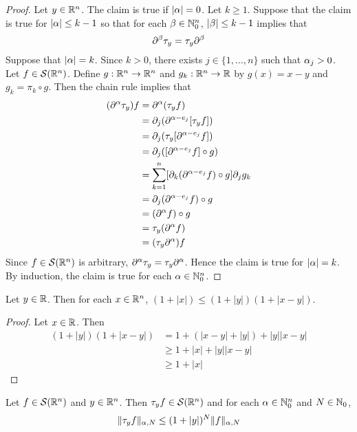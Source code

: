 \documentclass{book}
\begin{document}
	\begin{proof}
		Let $y \in \mathbb{R}^n$. The claim is true if $|\alpha| = 0$. Let $k \geq 1$. Suppose that the claim is true for $|\alpha| \leq k-1$ so that for each $\beta \in \mathbb{N}_0^n$, $|\beta| \leq k-1$ implies that
		$$\partial^{\beta}\tau_y = \tau_y \partial^{\beta}$$ 
		Suppose that $|\alpha| = k$. Since $k >0$, there exists $j \in \{1, \ldots, n\}$ such that $\alpha_j >0$. Let $f \in \mathcal{S}(\mathbb{R}^n)$. Define $g: \mathbb{R}^n \rightarrow \mathbb{R}^n$ and $g_k : \mathbb{R}^n \rightarrow \mathbb{R}$ by $g(x) = x-y$ and $g_k = \pi_k \circ g$. Then the chain rule implies that
		\begin{align*}
			(\partial^{\alpha} \tau_y) f
			& = \partial^{\alpha}( \tau_y f) \\
			& = \partial_j (\partial^{\alpha-e_j} [\tau_y f]) \\
			& = \partial_j (\tau_y [\partial^{\alpha-e_j} f]) \\
			& = \partial_j ([\partial^{\alpha-e_j} f] \circ g) \\
			& = \sum_{k=1}^n [\partial_k(\partial^{\alpha - e_j} f) \circ g]  \partial_j g_k \\ 
			& = \partial_j(\partial^{\alpha - e_j} f) \circ g \\
			& = (\partial^{\alpha} f) \circ g \\ 
			& = \tau_y ( \partial^{\alpha} f) \\
			& = (\tau_y  \partial^{\alpha}) f
		\end{align*}
		Since $f \in \mathcal{S}(\mathbb{R}^n)$ is arbitrary, $\partial^{\alpha} \tau_y = \tau_y  \partial^{\alpha}$. Hence the claim is true for $|\alpha| = k$. By induction, the claim is true for each $\alpha \in \mathbb{N}_0^n$.
	\end{proof}

	\begin{ex} 
		Let $y \in \mathbb{R}$. Then for each $x \in \mathbb{R}^n$,  $(1+|x|) \leq (1 + |y|)(1+ |x-y|)$.
	\end{ex}

	\begin{proof}
		Let $x \in \mathbb{R}$. Then 
		\begin{align*}
			(1 + |y|)(1+ |x-y|) 
			& = 1 + (|x-y| + |y|) + |y||x-y| \\
			& \geq 1 + |x| + |y||x-y| \\
			& \geq 1 + |x| 
		\end{align*}
	\end{proof}

	\begin{ex}
		Let $f \in \mathcal{S}(\mathbb{R}^n)$ and $y \in \mathbb{R}^n$. Then $\tau_y f \in \mathcal{S}(\mathbb{R}^n)$ and for each $\alpha \in \mathbb{N}_0^n$ and $N \in \mathbb{N}_0$, 
		$$\|\tau_yf\|_{\alpha, N} \leq (1 + |y|)^N \|f\|_{\alpha, N}$$
	\end{ex}
\end{document}
